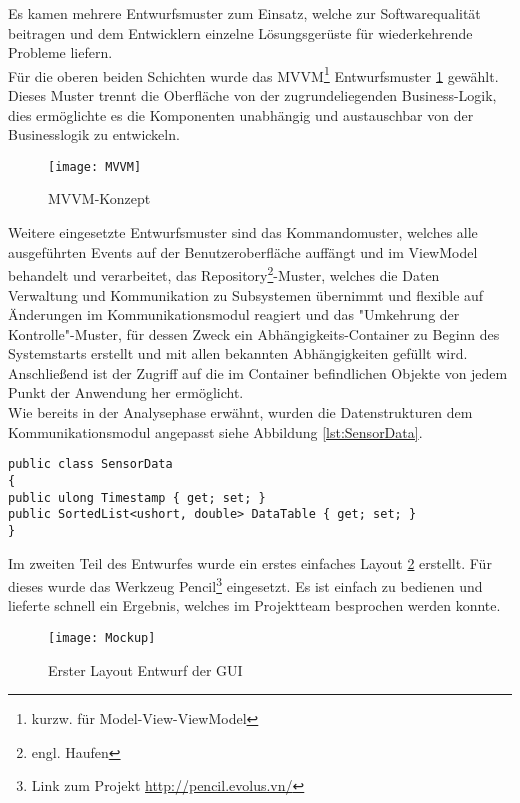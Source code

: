 Es kamen mehrere Entwurfsmuster zum Einsatz, welche zur Softwarequalität beitragen und dem Entwicklern einzelne Lösungsgerüste für wiederkehrende Probleme liefern.\\

Für die oberen beiden Schichten wurde das MVVM\footnote{kurzw. für Model-View-ViewModel} Entwurfsmuster \ref{fig:mvvm} gewählt. Dieses Muster trennt die Oberfläche von der zugrundeliegenden Business-Logik, dies ermöglichte es die Komponenten unabhängig und austauschbar von der Businesslogik zu entwickeln.\\ 

\begin{figure}[ht]
	\centering
		\texttt{[image: MVVM]}
		\caption{MVVM-Konzept}
		\label{fig:mvvm}
\end{figure}

Weitere eingesetzte Entwurfsmuster sind das Kommandomuster, welches alle ausgeführten Events auf der Benutzeroberfläche auffängt und im ViewModel behandelt und verarbeitet, das Repository\footnote{engl. Haufen}-Muster, welches die Daten Verwaltung und Kommunikation zu Subsystemen übernimmt und flexible auf Änderungen im Kommunikationsmodul reagiert und das "Umkehrung der Kontrolle"-Muster, für dessen Zweck ein Abhängigkeits-Container zu Beginn des Systemstarts erstellt und mit allen bekannten Abhängigkeiten gefüllt wird. Anschließend ist der Zugriff auf die im Container befindlichen Objekte von jedem Punkt der Anwendung her ermöglicht.\\

Wie bereits in der Analysephase erwähnt, wurden die Datenstrukturen dem Kommunikationsmodul angepasst siehe Abbildung \ref{lst:SensorData}.\\
\begin{lstlisting}[frame=single, caption=Beschreibung der Sensordatenstruktur, label=lst:SensorData]
public class SensorData
{
public ulong Timestamp { get; set; }
public SortedList<ushort, double> DataTable { get; set; }
}
\end{lstlisting}
Im zweiten Teil des Entwurfes wurde ein erstes einfaches Layout \ref{fig:gui} erstellt. Für dieses wurde das Werkzeug Pencil\footnote{Link zum Projekt \url{http://pencil.evolus.vn/}} eingesetzt. Es ist einfach zu bedienen und lieferte schnell ein Ergebnis, welches im Projektteam besprochen werden konnte.

\begin{figure}[ht]
	\centering
		\texttt{[image: Mockup]}
		\caption{Erster Layout Entwurf der GUI}
		\label{fig:gui}
\end{figure}

